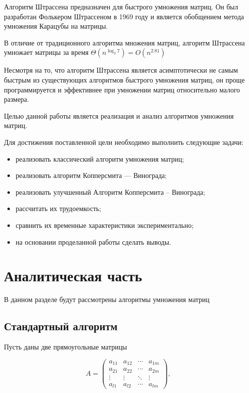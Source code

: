 Алгоритм Штрассена предназначен для быстрого умножения матриц. Он был разработан Фолькером Штрассеном в 1969 году и является обобщением метода умножения Карацубы на матрицы.

В отличие от традиционного алгоритма множения матриц, алгоритм Штрассена умножает матрицы за время $\Theta(n^{\log_2{7}}) = O(n^{2.81})$

Несмотря на то, что алгоритм Штрассена является асимптотически не самым быстрым из существующих алгоритмов быстрого умножения матриц, он проще программируется и эффективнее при умножении матриц относительно малого размера.

Целью данной работы является реализация и анализ алгоритмов умножения матриц.

Для достижения поставленной цели необходимо выполнить следующие задачи:
\begin{itemize}
    \item реализовать классический алгоритм умножения матриц;
    \item реализовать алгоритм Копперсмита — Винограда;
    \item реализовать улучшенный Алгоритм Копперсмита -- Винограда;
    \item рассчитать их трудоемкость;
    \item сравнить их временные характеристики экспериментально;
    \item на основании проделанной работы сделать выводы.
\end{itemize}

\section{Аналитическая часть}

В данном разделе будут рассмотрены алгоритмы умножения матриц

\subsection{Стандартный алгоритм}

Пусть даны две прямоугольные матрицы

\begin{equation}
    A =
      \begin{pmatrix}
        a_{11} & a_{12} & \cdots & a_{1m} \\
        a_{21} & a_{22} & \cdots & a_{2m} \\
        \vdots & \vdots & \ddots & \vdots \\
        a_{l1} & a_{l2} & \cdots & a_{lm}
      \end{pmatrix},
\end{equation}

